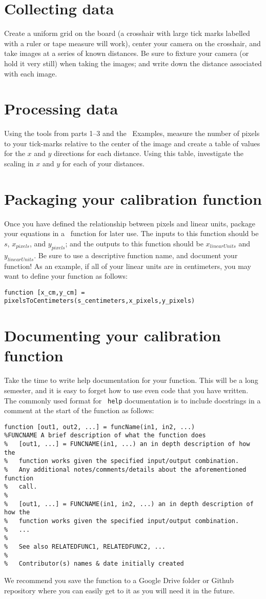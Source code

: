 \documentclass{tufte-handout}
\begin{document}
\section{Collecting data}
Create a uniform grid on the board (a crosshair with large tick marks labelled with a ruler or tape measure will work), center your camera on the crosshair, and take images at a series of known distances. Be sure to fixture your camera (or hold it very still) when taking the images; and write down the distance associated with each image. 

\section{Processing data}
Using the tools from parts 1--3 and the \Matlab\ Examples, measure the number of pixels to your tick-marks relative to the center of the image and create a table of values for the $x$ and $y$ directions for each distance. Using this table, investigate the scaling in $x$ and $y$ for each of your distances.

\clearpage
\section{Packaging your calibration function}
Once you have defined the relationship between pixels and linear units, package your equations in a \Matlab\ function for later use. The inputs to this function should be $s$, $x_{pixels}$, and $y_{pixels}$; and the outputs to this function should be $x_{linearUnits}$ and $y_{linearUnits}$. Be sure to use a descriptive function name, and document your function! As an example, if all of your linear units are in centimeters, you may want to define your function as follows:
\begin{lstlisting}[style=usnaMatlab]
function [x_cm,y_cm] = pixelsToCentimeters(s_centimeters,x_pixels,y_pixels)
\end{lstlisting}

\section{Documenting your calibration function}
Take the time to write help documentation for your function. This will be a long semester, and it is easy to forget how to use even code that you have written. The commonly used format for \Matlab\ \lstinline{help} documentation is to include docstrings in a comment at the start of the function as follows:
\begin{lstlisting}[style=usnaMatlab]
function [out1, out2, ...] = funcName(in1, in2, ...)
%FUNCNAME A brief description of what the function does
%	[out1, ...] = FUNCNAME(in1, ...) an in depth description of how the 
%	function works given the specified input/output combination.
%	Any additional notes/comments/details about the aforementioned function 
%	call.
%
%	[out1, ...] = FUNCNAME(in1, in2, ...) an in depth description of how the 
%	function works given the specified input/output combination.
%	...
%
% 	See also RELATEDFUNC1, RELATEDFUNC2, ...
%
%	Contributor(s) names & date initially created
\end{lstlisting}

We recommend you save the function to a Google Drive folder or Github repository where you can easily get to it as you will need it in the future. 
\end{document}
